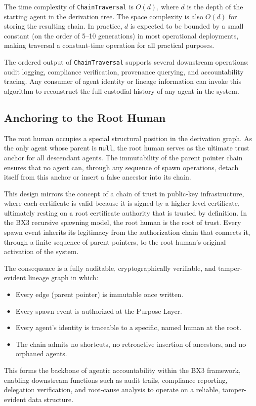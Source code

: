 The time complexity of \texttt{ChainTraversal} is $O(d)$, where $d$ is the
depth of the starting agent in the derivation tree. The space complexity is
also $O(d)$ for storing the resulting chain. In practice, $d$ is expected
to be bounded by a small constant (on the order of 5--10 generations) in
most operational deployments, making traversal a constant-time operation for
all practical purposes.

The ordered output of \texttt{ChainTraversal} supports several downstream
operations: audit logging, compliance verification, provenance querying,
and accountability tracing. Any consumer of agent identity or lineage
information can invoke this algorithm to reconstruct the full custodial
history of any agent in the system.

\subsection{Anchoring to the Root Human}

The root human occupies a special structural position in the derivation
graph. As the only agent whose parent is \texttt{null}, the root human
serves as the ultimate trust anchor for all descendant agents. The
immutability of the parent pointer chain ensures that no agent can,
through any sequence of spawn operations, detach itself from this anchor
or insert a false ancestor into its chain.

This design mirrors the concept of a chain of trust in public-key
infrastructure, where each certificate is valid because it is signed by
a higher-level certificate, ultimately resting on a root certificate
authority that is trusted by definition. In the BX3 recursive spawning
model, the root human is the root of trust. Every spawn event inherits its
legitimacy from the authorization chain that connects it, through a finite
sequence of parent pointers, to the root human's original activation of the
system.

The consequence is a fully auditable, cryptographically verifiable, and
tamper-evident lineage graph in which:

\begin{itemize}
  \item Every edge (parent pointer) is immutable once written.
  \item Every spawn event is authorized at the Purpose Layer.
  \item Every agent's identity is traceable to a specific, named human at
        the root.
  \item The chain admits no shortcuts, no retroactive insertion of
        ancestors, and no orphaned agents.
\end{itemize}

This forms the backbone of agentic accountability within the BX3 framework,
enabling downstream functions such as audit trails, compliance reporting,
delegation verification, and root-cause analysis to operate on a reliable,
tamper-evident data structure.
